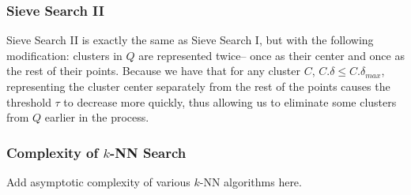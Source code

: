 \subsubsection{Sieve Search II}
\label{subsubsec:methods:knn-search:sieve2}
Sieve Search II is exactly the same as Sieve Search I, but with the following modification: clusters 
in $Q$ are represented twice-- once as their center and once as the rest of their points. 
Because we have that for any cluster $C$, $C.\delta \leq C.\delta_{max}$, representing the cluster 
center separately from the rest of the points causes the threshold $\tau$ to decrease more quickly, 
thus allowing us to eliminate some clusters from $Q$ earlier in the process.

\subsubsection{Complexity of $k$-NN Search}
\label{paragraph:methods:knn-complexity}
Add asymptotic complexity of various $k$-NN algorithms here.